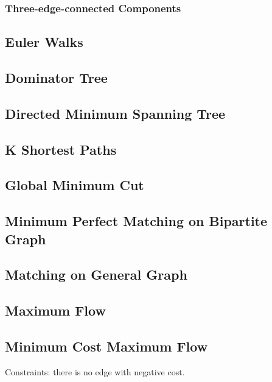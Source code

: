 \documentclass{article}
\begin{document}
\begin{multicols}{3}
    \subsubsection{Three-edge-connected Components}
    

    \subsection{Euler Walks}
    

    \subsection{Dominator Tree}
    

    \subsection{Directed Minimum Spanning Tree}
    

    \subsection{K Shortest Paths}
    

    \subsection{Global Minimum Cut}
    

    \subsection{Minimum Perfect Matching on Bipartite Graph}
    

    \subsection{Matching on General Graph}
    

    \subsection{Maximum Flow}
    

    \subsection{Minimum Cost Maximum Flow}
    Constraints: there is no edge with negative cost.
    


\end{multicols}
\end{document}
